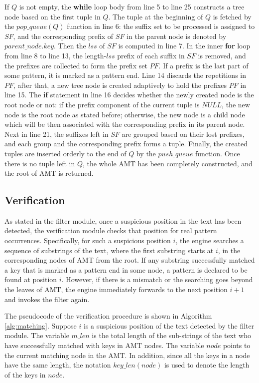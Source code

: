 If $Q$ is not empty, the \textbf{while} loop body from line 5 to line
25 constructs a tree node based on the first tuple in $Q$. The tuple
at the beginning of $Q$ is fetched by the $pop\_queue(Q)$ function in
line 6: the suffix set to be processed is assigned to $SF$, and the
corresponding prefix of $SF$ in the parent node is denoted by
$parent\_node.key$. Then the $lss$ of $SF$ is computed in line 7. In
the inner \textbf{for} loop from line 8 to line 13, the length-$lss$
prefix of each suffix in $SF$ is removed, and the prefixes are
collected to form the prefix set $PF$. If a prefix is the last part of
some pattern, it is marked as a pattern end. Line 14 discards the
repetitions in $PF$, after that, a new tree node is created adaptively
to hold the prefixes $PF$ in line 15. The \textbf{if} statement in
line 16 decides whether the newly created node is the root node or
not: if the prefix component of the current tuple is $NULL$, the new
node is the root node as stated before; otherwise, the new node is a
child node which will be then associated with the corresponding prefix
in its parent node. Next in line 21, the suffixes left in $SF$ are
grouped based on their lost prefixes, and each group and the
corresponding prefix forms a tuple. Finally, the created tuples are
inserted orderly to the end of $Q$ by the $push\_queue$ function. Once
there is no tuple left in $Q$, the whole AMT has been completely
constructed, and the root of AMT is returned.

\subsection{Verification}
\label{subsec:matching}

As stated in the filter module, once a suspicious position in the text
has been detected, the verification module checks that position for
real pattern occurrences. Specifically, for such a suspicious position
$i$, the engine searches a sequence of substrings of the text, where
the first substring starts at $i$, in the corresponding nodes of AMT
from the root. If any substring successfully matched a key that is
marked as a pattern end in some node, a pattern is declared to be
found at position $i$. However, if there is a mismatch or the
searching goes beyond the leaves of AMT, the engine immediately
forwards to the next position $i+1$ and invokes the filter again.

The pseudocode of the verification procedure is shown in Algorithm
\ref{alg:matching}. Suppose $i$ is a suspicious position of the text
detected by the filter module. The variable $m\_len$ is the total
length of the sub-strings of the text who have successfully matched
with keys in AMT nodes. The variable $node$ points to the current
matching node in the AMT. In addition, since all the keys in a node
have the same length, the notation $key\_len(node)$ is used to denote
the length of the keys in $node$.

